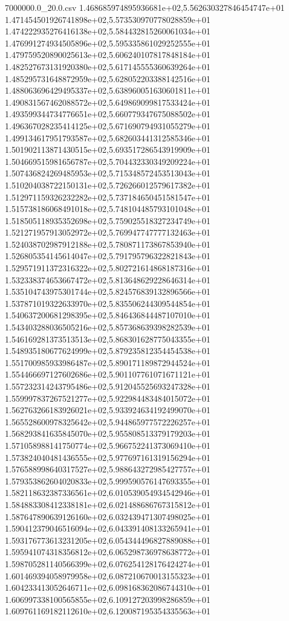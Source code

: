 \begin{filecontents*}{7000000.0_20.0.csv}
1.468685974895936681e+02,5.562630327846454747e+01
1.471454501926741898e+02,5.573530970778028859e+01
1.474222935276416138e+02,5.584432815260061034e+01
1.476991274934505896e+02,5.595335861029252555e+01
1.479759520890025613e+02,5.606240107817848184e+01
1.482527673131920380e+02,5.617145555360639264e+01
1.485295731648872959e+02,5.628052203388142516e+01
1.488063696429495337e+02,5.638960051630601811e+01
1.490831567462088572e+02,5.649869099817533424e+01
1.493599344734776651e+02,5.660779347675088502e+01
1.496367028235414125e+02,5.671690794931055279e+01
1.499134617951793587e+02,5.682603441312585346e+01
1.501902113871430515e+02,5.693517286543919909e+01
1.504669515981656787e+02,5.704432330349209224e+01
1.507436824269485953e+02,5.715348572453513043e+01
1.510204038722150131e+02,5.726266012579617382e+01
1.512971159326232282e+02,5.737184650451581547e+01
1.515738186068491018e+02,5.748104485793101048e+01
1.518505118935352698e+02,5.759025518327234749e+01
1.521271957913052972e+02,5.769947747777132463e+01
1.524038702987912188e+02,5.780871173867853940e+01
1.526805354145614047e+02,5.791795796322821843e+01
1.529571911372316322e+02,5.802721614868187316e+01
1.532338374653667472e+02,5.813648629228646314e+01
1.535104743975301744e+02,5.824576839132896566e+01
1.537871019322633970e+02,5.835506244309544854e+01
1.540637200681298395e+02,5.846436844487107010e+01
1.543403288036505216e+02,5.857368639398282539e+01
1.546169281373513513e+02,5.868301628775043355e+01
1.548935180677624999e+02,5.879235812354454538e+01
1.551700985933986487e+02,5.890171189872944524e+01
1.554466697127602686e+02,5.901107761071671121e+01
1.557232314243795486e+02,5.912045525693247328e+01
1.559997837267521277e+02,5.922984483484015072e+01
1.562763266183926021e+02,5.933924634192499070e+01
1.565528600978325642e+02,5.944865977572226257e+01
1.568293841635845070e+02,5.955808513379179203e+01
1.571058988141750774e+02,5.966752241373069410e+01
1.573824040481436555e+02,5.977697161319156294e+01
1.576588998640317527e+02,5.988643272985427757e+01
1.579353862604020833e+02,5.999590576147693355e+01
1.582118632387336561e+02,6.010539054934542946e+01
1.584883308412338181e+02,6.021488686767315812e+01
1.587647890639126160e+02,6.032439471307498025e+01
1.590412379046516094e+02,6.043391408133265941e+01
1.593176773613231205e+02,6.054344496827889088e+01
1.595941074318356812e+02,6.065298736978638772e+01
1.598705281140566399e+02,6.076254128176424274e+01
1.601469394058979958e+02,6.087210670013155323e+01
1.604233413052646711e+02,6.098168362086744310e+01
1.606997338100565855e+02,6.109127203998286859e+01
1.609761169182112610e+02,6.120087195354335563e+01

\end{filecontents*}
